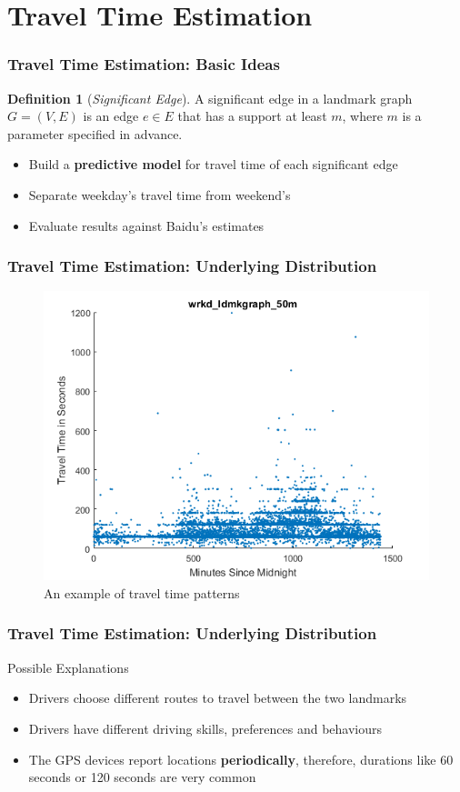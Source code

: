 \documentclass{beamer}
\theoremstyle{definition}
\newtheorem{defn}{Definition}
\begin{document}
\section{Travel Time Estimation}
\begin{frame}
\frametitle{Travel Time Estimation: Basic Ideas}

\begin{defn}[\emph{Significant Edge}]
A significant edge in a landmark graph $G=(V,E)$ is an edge $e \in E$ that has a support at least $m$, where $m$ is a parameter specified in advance.
\end{defn}
\begin{itemize}
	\item <2-> Build a \textbf{predictive model} for travel time of each significant edge
	\item <3-> Separate weekday's travel time from weekend's	
	\item <4-> Evaluate results against Baidu's estimates
\end{itemize}
\end{frame}

\begin{frame}
\frametitle{Travel Time Estimation: Underlying Distribution}
\begin{figure}[h!]
\includegraphics[scale=0.5]{trvltime_scatter}
\centering
\caption{An example of travel time patterns}\label{Fig:wrkd_50m_trvltime}
\end{figure}
\end{frame}

\begin{frame}
\frametitle{Travel Time Estimation: Underlying Distribution}
Possible Explanations
\begin{itemize}
	\item <1-> Drivers choose different routes to travel between the two landmarks
	\item <2-> Drivers have different driving skills, preferences and behaviours
	\item <3-> The GPS devices report locations \textbf{periodically}, therefore, durations like 60 seconds or 120 seconds are very common
\end{itemize}
\end{frame}
\end{document}
